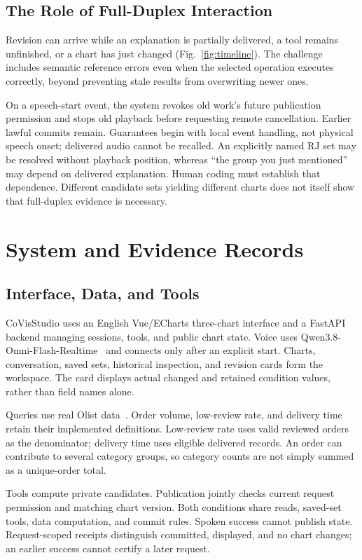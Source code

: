 \documentclass[conference,10pt,letterpaper]{IEEEtran}
\newcommand{\sys}{CoVisStudio}
\begin{document}
\subsection{The Role of Full-Duplex Interaction}
Revision can arrive while an explanation is partially delivered, a tool remains unfinished, or a chart has just changed (Fig.~\ref{fig:timeline}). The challenge includes semantic reference errors even when the selected operation executes correctly, beyond preventing stale results from overwriting newer ones.

On a speech-start event, the system revokes old work's future publication permission and stops old playback before requesting remote cancellation. Earlier lawful commits remain. Guarantees begin with local event handling, not physical speech onset; delivered audio cannot be recalled. An explicitly named RJ set may be resolved without playback position, whereas ``the group you just mentioned'' may depend on delivered explanation. Human coding must establish that dependence. Different candidate sets yielding different charts does not itself show that full-duplex evidence is necessary.

\section{System and Evidence Records}
\subsection{Interface, Data, and Tools}
\sys{} uses an English Vue/ECharts three-chart interface and a FastAPI backend managing sessions, tools, and public chart state. Voice uses Qwen3.8-Omni-Flash-Realtime~\cite{qwenrealtime} and connects only after an explicit start. Charts, conversation, saved sets, historical inspection, and revision cards form the workspace. The card displays actual changed and retained condition values, rather than field names alone.

Queries use real Olist data~\cite{olist}. Order volume, low-review rate, and delivery time retain their implemented definitions. Low-review rate uses valid reviewed orders as the denominator; delivery time uses eligible delivered records. An order can contribute to several category groups, so category counts are not simply summed as a unique-order total.

Tools compute private candidates. Publication jointly checks current request permission and matching chart version. Both conditions share reads, saved-set tools, data computation, and commit rules. Spoken success cannot publish state. Request-scoped receipts distinguish committed, displayed, and no chart changes; an earlier success cannot certify a later request.
\end{document}
